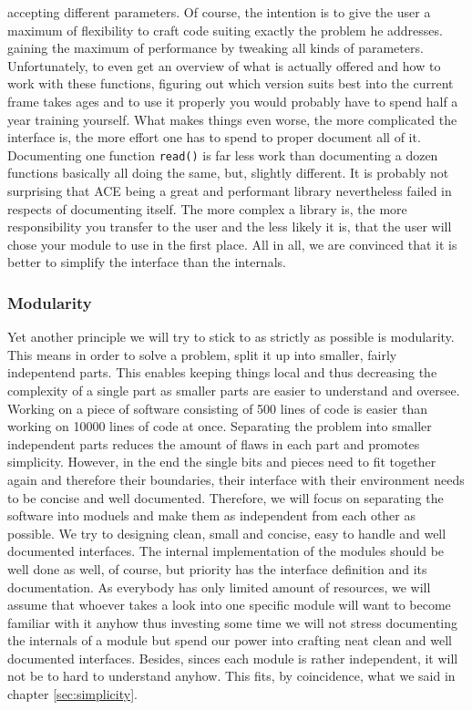 accepting different parameters. Of course, the intention is to give the user 
a maximum of flexibility to craft code suiting exactly the problem he addresses.
gaining the maximum of performance by tweaking all kinds of parameters.
Unfortunately, to even get an overview of what is actually offered and how to
work with these functions, figuring out which version suits best into the 
current frame takes ages and to use it properly you would probably have to spend
half a year training yourself.
What makes things even worse, the more complicated the interface is, the
more effort one has to spend to proper document all of it. 
Documenting one function \texttt{read()} is far less work than documenting a
dozen functions basically all doing the same, but, slightly different. 
It is probably not surprising that ACE being a great and performant library
nevertheless failed in respects of documenting itself. 
The more complex a library is, the more responsibility you transfer to the user
and the less likely it is, that the user will chose your module to use in the
first place.
All in all, we are convinced that it is better to simplify the interface 
than the internals.

\subsubsection{Modularity}

Yet another principle we will try to stick to as strictly as possible is 
modularity.
This means in order to solve a problem, split it up into smaller, fairly 
indepentend parts. 
This enables keeping things local and thus decreasing the complexity of a 
single part as smaller parts are easier to understand and oversee.
Working on a piece of software consisting of 500 lines of code is easier than 
working on 10000 lines of code at once.
Separating the problem into smaller independent parts reduces the amount of 
flaws in each part and promotes simplicity.
However, in the end the single bits and pieces need to fit together again and 
therefore their boundaries, their interface with their environment needs to 
be concise and well documented.
Therefore, we will focus on separating the software into moduels and make them 
as independent from each other as possible.
We try to designing clean, small and concise, easy to handle and well documented
interfaces.  
The internal implementation of the modules should be well done as well, of 
course, but priority has the interface definition and its documentation.
As everybody has only limited amount of resources, we will assume that whoever
takes a look into one specific module will want to become familiar with it 
anyhow thus investing some time we will not stress documenting the internals 
of a module but spend our power into crafting neat clean and well documented 
interfaces.
Besides, sinces each module is rather independent, it will not be to hard to
understand anyhow.
This fits, by coincidence, what we said in chapter \ref{sec:simplicity}.

